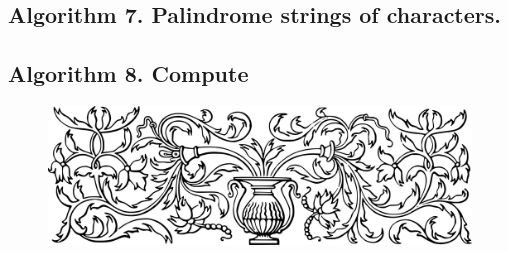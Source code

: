 \documentclass[preview]{standalone}
\begin{document}
\subsection[Palindrome strings of characters.]{
    \color{section} Algorithm 7. \color{black} Palindrome strings of characters.
}
\vspace{-1\baselineskip}

\vspace{1\baselineskip}
\begin{center}
    
\end{center}
\vspace{0\baselineskip}
\begin{center}
    
\end{center}
\pagebreak


\subsection[Compute beta to the power of lambda.]{
    \color{section} Algorithm 8. \color{black} Compute \bm{$\beta^\lambda$}
}
\vspace{-1\baselineskip}

\vspace{1\baselineskip}
\begin{center}
    
\end{center}
\vspace{1\baselineskip}
\begin{center}
    
\end{center}
\pagebreak


\begin{figure}[!h]
    \centering
    \includegraphics[width=14cm]{../resources/jpg/3.1.algorithms/border1.png}
\end{figure}
\end{document}
